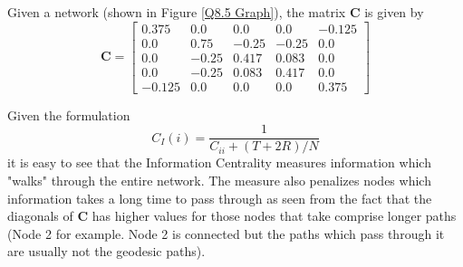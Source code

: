 \documentclass[]{article}
\begin{document}
Given a network (shown in Figure \ref{Q8.5 Graph}), the matrix $\mathbf{C}$ is given by
\[
	\mathbf{C} = \begin{bmatrix}
		0.375 & 0.0 & 0.0 & 0.0 & -0.125 \\
		0.0 & 0.75 & -0.25 & -0.25 & 0.0 \\
		0.0 & -0.25 & 0.417 & 0.083 & 0.0 \\
		0.0 & -0.25 & 0.083 & 0.417 & 0.0 \\
		-0.125 & 0.0 & 0.0 & 0.0 & 0.375
	\end{bmatrix}
\]

Given the formulation 
\[
	C_I(i) = \frac{1}{C_{ii} + (T + 2R) / N}
\]
it is easy to see that the Information Centrality measures information which "walks" through the entire network. The measure also penalizes nodes which information takes a long time to pass through as seen from the fact that the diagonals of $\mathbf{C}$ has higher values for those nodes that take comprise longer paths (Node 2 for example. Node 2 is connected but the paths which pass through it are usually not the geodesic paths).
\end{document}
